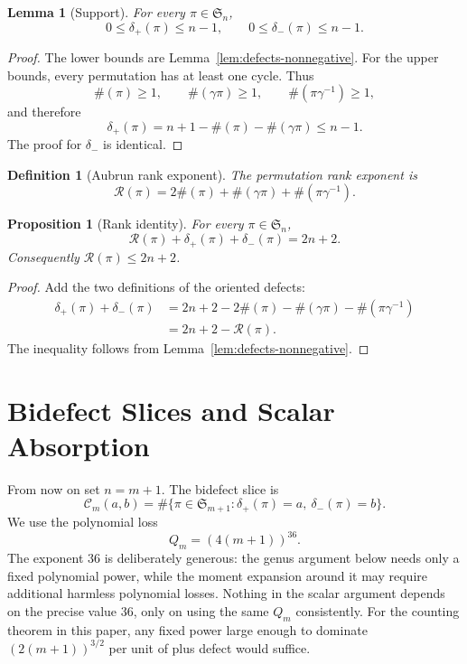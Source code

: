 \documentclass[11pt]{article}
\numberwithin{equation}{section}
\newtheorem{proposition}[theorem]{Proposition}
\newtheorem{lemma}[theorem]{Lemma}
\newtheorem{definition}[theorem]{Definition}
\newcommand{\Sym}{\mathfrak S}
\newcommand{\cyc}{\#}
\newcommand{\g}{\gamma}
\newcommand{\ddp}{\delta_{+}}
\newcommand{\ddm}{\delta_{-}}
\newcommand{\rank}{\mathcal R}
\newcommand{\Count}{\mathcal C}
\newcommand{\Loss}{Q}
\begin{document}
\begin{lemma}[Support]\label{lem:defect-support}
For every \(\pi\in\Sym_n\),
\[
  0\le \ddp(\pi)\le n-1,
  \qquad
  0\le \ddm(\pi)\le n-1.
\]
\end{lemma}

\begin{proof}
The lower bounds are Lemma~\ref{lem:defects-nonnegative}.  For the upper
bounds, every permutation has at least one cycle.  Thus
\[
  \cyc(\pi)\ge1,\qquad
  \cyc(\g\pi)\ge1,\qquad
  \cyc(\pi\g^{-1})\ge1,
\]
and therefore
\[
  \ddp(\pi)=n+1-\cyc(\pi)-\cyc(\g\pi)\le n-1.
\]
The proof for \(\ddm\) is identical.
\end{proof}

\begin{definition}[Aubrun rank exponent]
The permutation rank exponent is
\[
  \rank(\pi)=2\cyc(\pi)+\cyc(\g\pi)+\cyc(\pi\g^{-1}).
\]
\end{definition}

\begin{proposition}[Rank identity]\label{prop:rank-identity}
For every \(\pi\in\Sym_n\),
\[
  \rank(\pi)+\ddp(\pi)+\ddm(\pi)=2n+2.
\]
Consequently \(\rank(\pi)\le 2n+2\).
\end{proposition}

\begin{proof}
Add the two definitions of the oriented defects:
\[
\begin{aligned}
  \ddp(\pi)+\ddm(\pi)
  &=
  2n+2
  -2\cyc(\pi)
  -\cyc(\g\pi)
  -\cyc(\pi\g^{-1})\\
  &=2n+2-\rank(\pi).
\end{aligned}
\]
The inequality follows from Lemma~\ref{lem:defects-nonnegative}.
\end{proof}

\section{Bidefect Slices and Scalar Absorption}

From now on set \(n=m+1\).  The bidefect slice is
\[
  \Count_m(a,b)
  =
  \#\{\pi\in\Sym_{m+1}:\ddp(\pi)=a,\ \ddm(\pi)=b\}.
\]
We use the polynomial loss
\[
  \Loss_m=(4(m+1))^{36}.
\]
The exponent \(36\) is deliberately generous: the genus argument below needs
only a fixed polynomial power, while the moment expansion around it may
require additional harmless polynomial losses.  Nothing in the scalar
argument depends on the precise value \(36\), only on using the same
\(\Loss_m\) consistently.  For the counting theorem in this paper, any fixed
power large enough to dominate \((2(m+1))^{3/2}\) per unit of plus defect
would suffice.
\end{document}
